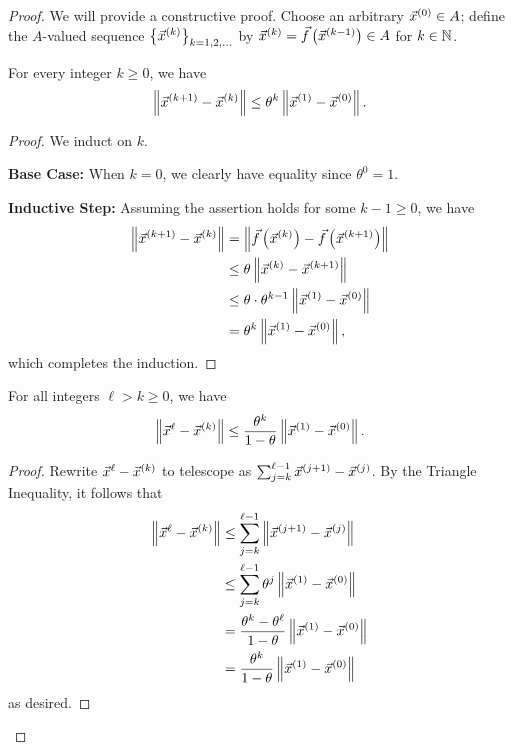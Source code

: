 \documentclass[main.tex]{subfiles}
\begin{document}
\begin{proof}
    We will provide a constructive proof. Choose an arbitrary $\vec{x}^{(0)}\in A$; define the $A$-valued sequence $\left\{ \vec{x}^{(k)} \right\}_{k = 1, 2, \ldots}$ by $\vec{x}^{(k)} = \vec{f}\left( \vec{x}^{(k - 1)} \right) \in A$ for $k \in \mathbb N$.

    \begin{claim}
        For every integer $k\ge 0$, we have
        \[\left\lVert \vec{x}^{(k + 1)} - \vec{x}^{(k)} \right\rVert \le \theta^k\left\lVert \vec{x}^{(1)} - \vec{x}^{(0)} \right\rVert.\]
    \end{claim}

    \begin{proof}
        We induct on $k$.

        \textbf{Base Case:} When $k = 0$, we clearly have equality since $\theta^0 = 1$.

        \textbf{Inductive Step:} Assuming the assertion holds for some $k - 1 \ge 0$, we have
        \begin{align*}
            \left\lVert \vec{x}^{(k + 1)} - \vec{x}^{(k)} \right\rVert &= \left\lVert \vec{f}\left( \vec{x}^{(k)} \right) - \vec{f}\left( \vec{x}^{(k + 1)} \right) \right\rVert \\
            &\le \theta \left\lVert \vec{x}^{(k)} - \vec{x}^{(k + 1)} \right\rVert \\
            &\le \theta \cdot \theta^{k - 1} \left\lVert \vec{x}^{(1)} - \vec{x}^{(0)} \right\rVert \\
            &=\theta^k\left\lVert \vec{x}^{(1)} - \vec{x}^{(0)} \right\rVert,
        \end{align*}
        which completes the induction.
    \end{proof}

    \begin{claim}
        For all integers $\ell > k \ge 0$, we have
        \[\left\lVert \vec{x}^{\ell} - \vec{x}^{(k)} \right\rVert \le \frac{\theta^k}{1 - \theta}\left\lVert \vec{x}^{(1)} - \vec{x}^{(0)} \right\rVert.\]
    \end{claim}

    \begin{proof}
        Rewrite $\vec{x}^{\ell} - \vec{x}^{(k)}$ to telescope as $\sum_{j = k}^{\ell - 1} \vec{x}^{(j + 1)} - \vec{x}^{(j)}$. By the Triangle Inequality, it follows that
        \begin{align*}
            \left\lVert \vec{x}^{\ell} - \vec{x}^{(k)} \right\rVert &\le \sum_{j = k}^{\ell - 1} \left\lVert \vec{x}^{(j + 1)} - \vec{x}^{(j)} \right\rVert \\
            &\le \sum_{j = k}^{\ell - 1} \theta^j\left\lVert \vec{x}^{(1)} - \vec{x}^{(0)} \right\rVert \\
            &= \frac{\theta^k - \theta^\ell}{1 - \theta}\left\lVert \vec{x}^{(1)} - \vec{x}^{(0)} \right\rVert \\
            &= \frac{\theta^k}{1 - \theta}\left\lVert \vec{x}^{(1)} - \vec{x}^{(0)} \right\rVert
        \end{align*}
        as desired.
    \end{proof}


\end{proof}
\end{document}
